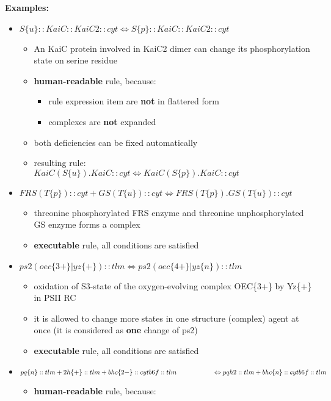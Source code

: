 \documentclass[12pt]{article}
\newcommand{\mysmallsection}[1]{\vspace{0.5cm}\large\textbf{#1}\normalsize\vspace{0.5cm}}
\begin{document}
\mysmallsection{Examples:}
\begin{itemize}
\item $S\{u\}::KaiC::KaiC2::cyt \Leftrightarrow S\{p\}::KaiC::KaiC2::cyt$
	\begin{itemize}
		\item An KaiC protein involved in KaiC2 dimer can change its phosphorylation state on serine residue
		\item \textbf{human-readable} rule, because:
			\begin{itemize}
				\item rule expression item are \textbf{not} in flattered form
				\item complexes are \textbf{not} expanded
			\end{itemize}
		\item both deficiencies can be fixed automatically
		\item resulting rule:\\
	$KaiC(S\{u\}).KaiC::cyt \Leftrightarrow KaiC(S\{p\}).KaiC::cyt$
	\end{itemize}
\item $FRS(T\{p\})::cyt + GS(T\{u\})::cyt \Leftrightarrow FRS(T\{p\}).GS(T\{u\})::cyt$
	\begin{itemize}
		\item threonine phosphorylated FRS enzyme and threonine unphosphorylated GS enzyme forms a complex
		\item \textbf{executable} rule, all conditions are satisfied
	\end{itemize}
\item $ps2(oec\{3+\}|yz\{+\})::tlm \Leftrightarrow ps2(oec\{4+\}|yz\{n\})::tlm$
	\begin{itemize}
		\item oxidation of S3-state of the oxygen-evolving complex OEC\{3+\} by Yz\{+\} in PSII RC
		\item it is allowed to change more states in one structure (complex) agent at once (it is considered as \textbf{one} change of ps2)
		\item \textbf{executable} rule, all conditions are satisfied
	\end{itemize}
	\newpage
\item {\small $pq\{n\}::tlm + 2 h\{+\}::tlm + bhc\{2-\}::cytb6f::tlm \\ \hspace*{1.9cm} \Leftrightarrow pqh2::tlm + bhc\{n\}::cytb6f::tlm$}
	\begin{itemize}
		\item \textbf{human-readable} rule, because:

\end{itemize}
\end{itemize}
\end{document}
